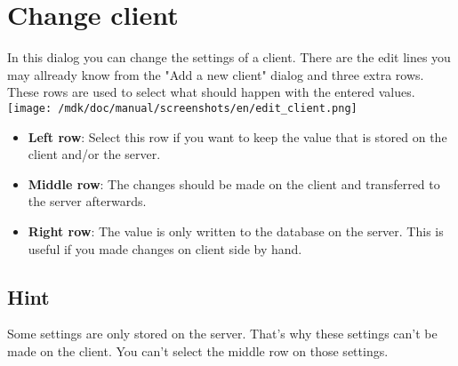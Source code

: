 \section{Change client}In this dialog you can change the settings of a client. There are the edit lines you may allready know from the "Add a new client" dialog and three extra rows. These rows are used to select what should happen with the entered values.\\
\texttt{[image: /mdk/doc/manual/screenshots/en/edit\_client.png]} \\
\begin{itemize}
\item \textbf{Left row}: Select this row if you want to keep the value that is stored on the client and/or the server.\\
\item \textbf{Middle row}: The changes should be made on the client and transferred to the server afterwards.\\
\item \textbf{Right row}: The value is only written to the database on the server. This is useful if you made changes on client side by hand.\\
\end{itemize}
\subsection{Hint}
Some settings are only stored on the server. That's why these settings can't be made on the client. You can't select the middle row on those settings.\\
